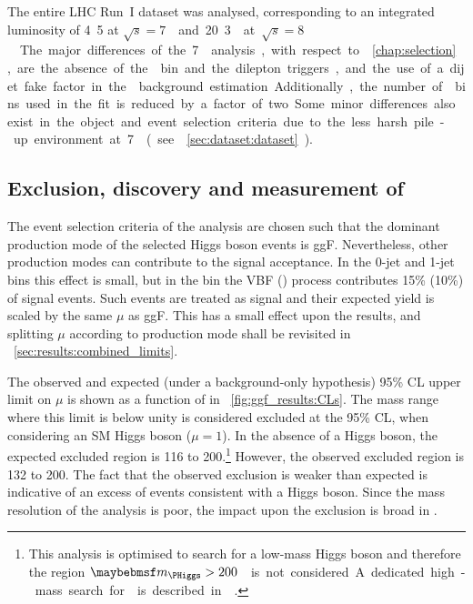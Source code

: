 
The entire LHC Run~I dataset was analysed, corresponding to an integrated luminosity of 
\unit{4.5}{\invfb} at \unit{$\sqrt{s} = 7$}{\TeV} and \unit{20.3}{\invfb} at 
\unit{$\sqrt{s} = 8$}{\TeV}. The major differences of the \unit{7}{\TeV} analysis, with 
respect to \Chapter~\ref{chap:selection}, are the absence of the \twojet bin and the 
dilepton triggers, and the use of a dijet fake factor in the \Wjets background estimation. 
Additionally, the number of \mt bins used in the fit is reduced by a factor of two.
Some minor differences also exist in the object and event selection criteria due to the less 
harsh pile-up environment at \unit{7}{\TeV} (see \Section~\ref{sec:dataset:dataset}).



\subsection{Exclusion, discovery and measurement of \ggHWW}
\label{sec:results:ggF_limits}

The event selection criteria of the \ggHWW analysis are chosen such that the dominant 
production mode of the selected Higgs boson events is ggF. Nevertheless, other production 
modes can contribute to the signal acceptance. In the 0-jet and 1-jet bins this effect is 
small, but in the \twojet bin the VBF (\VH) process contributes 15\% (10\%) of signal events.
Such events are treated as signal and their expected yield is scaled by the same $\mu$ as 
ggF. This has a small effect upon the results, and splitting $\mu$ according to production 
mode shall be revisited in \Section~\ref{sec:results:combined_limits}.

The observed and expected (under a background-only hypothesis) 95\% CL upper limit on $\mu$ 
is shown as a function of \mH in \Figure~\ref{fig:ggf_results:CLs}. The mass range where 
this limit is below unity is considered excluded at the 95\% CL, when considering an SM 
Higgs boson ($\mu = 1$). In the absence of a Higgs boson, the expected excluded region is 
\unit{116}{\GeV} to \unit{200}{\GeV}.\footnote{
	This analysis is optimised to search for a low-mass Higgs boson and therefore the region 
	\unit{$\mH > 200$}{\GeV} is not considered. A dedicated high-mass search for \HWW is 
	described in \Reference~\cite{HWW-highmass}.
}
However, the observed excluded region is \unit{132}{\GeV} to \unit{200}{\GeV}.
The fact that the observed exclusion is weaker than expected is indicative of an excess of 
events consistent with a Higgs boson. Since the mass resolution of the \HWW analysis is 
poor, the impact upon the exclusion is broad in \mH.

